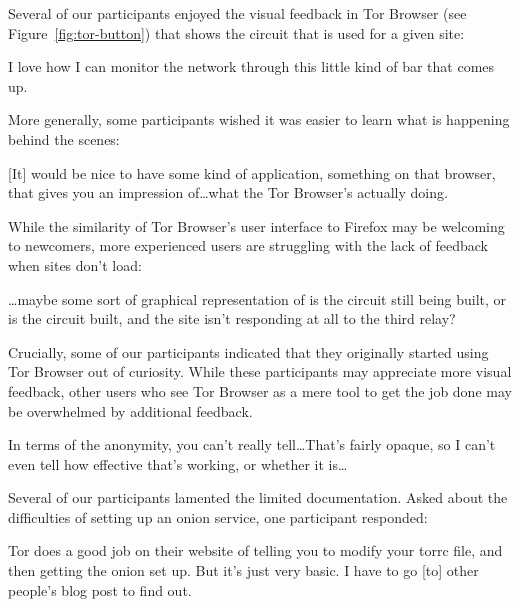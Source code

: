 Several of our participants enjoyed the visual feedback in Tor Browser (see
Figure~\ref{fig:tor-button}) that shows the circuit that is used for a given
site:

\begin{displayquote}
I love how I can monitor the network through this little kind of bar that
comes up.
\end{displayquote}

More generally, some participants wished it was easier to learn what is
happening behind the scenes:

\begin{displayquote}
{[It]} would be nice to have some kind of application, something on that browser,
that gives you an impression of\dots what the Tor Browser's actually doing.
\end{displayquote}

While the similarity of Tor
Browser's user interface to Firefox may be welcoming to newcomers, more
experienced users are struggling with the lack of feedback when sites don't
load:

\begin{displayquote}
\dots maybe some sort of graphical representation of is the circuit still
being built, or is the circuit built, and the site isn't responding at all to
the third relay?
\end{displayquote}

Crucially, some of our participants indicated that they originally started using
Tor Browser out of curiosity.  While these participants may appreciate more
visual feedback, other users who see Tor Browser as a mere tool to get the job
done may be overwhelmed by additional feedback.

\begin{displayquote}
In terms of the anonymity, you can't really tell\dots That's fairly opaque, so I
can't even tell how effective that's working, or whether it is\dots
\end{displayquote}

Several of our participants lamented the limited documentation.  Asked about the
difficulties of setting up an onion service, one participant responded:

\begin{displayquote}
Tor does a good job on their website of telling you to modify your torrc file,
and then getting the onion set up.  But it's just very basic.  I have to go [to]
other people's blog post to find out.
\end{displayquote}

